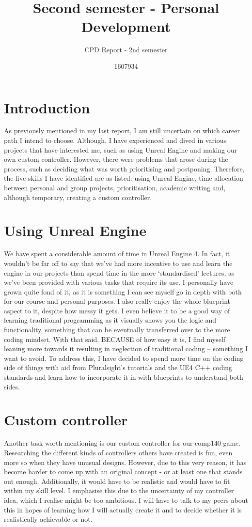 \documentclass{scrartcl}
\title{Second semester -  Personal Development}
\subtitle{CPD Report - 2nd semester}
\author{1607934}
\begin{document}
\maketitle

\section{Introduction}
As previously mentioned in my last report, I am still uncertain on which career path I intend to choose. Although, I have experienced and dived in various projects that have interested me, such as using Unreal Engine and making our own custom controller. However, there were problems that arose during the process, such as deciding what was worth prioritising and postponing. Therefore, the five skills I have identified are as listed: using Unreal Engine, time allocation between personal and group projects, prioritisation, academic writing and, although temporary, creating a custom controller.  

\section{Using Unreal Engine}
We have spent a considerable amount of time in Unreal Engine 4. In fact, it wouldn't be far off to say that we've had more incentive to use and learn the engine in our projects than spend time in the more `standardised' lectures, as we've been provided with various tasks that require its use. I personally have grown quite fond of it, as it is something I can see myself go in depth with both for our course and personal purposes. I also really enjoy the whole blueprint-aspect to it, despite how messy it gets. I even believe it to be a good way of learning traditional programming as it visually shows you the logic and functionality, something that can be eventually transferred over to the more coding mindset. With that said, BECAUSE of how easy it is, I find myself leaning more towards it resulting in neglection of traditional coding -- something I want to avoid. To address this, I have decided to spend more time on the coding side of things with aid from Pluralsight's tutorials and the UE4 C++ coding standards and learn how to incorporate it in with blueprints to understand both sides. 

\section{Custom controller}
Another task worth mentioning is our custom controller for our comp140 game. Researching the different kinds of controllers others have created is fun, even more so when they have unusual designs. However, due to this very reason, it has become harder to come up with an original concept - or at least one that stands out enough. Additionally, it would have to be realistic and would have to fit within my skill level. I emphasise this due to the uncertainty of my controller idea, which I realise might be too ambitious. I will have to talk to my peers about this in hopes of learning how I will actually create it and to decide whether it is realistically achievable or not. 
\end{document}
